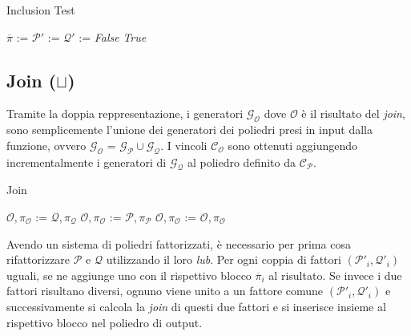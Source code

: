 \documentclass{mimosis}
\theoremstyle{definition}
\begin{document}
\begin{algorithm}[H]
\caption{Inclusion Test}\label{inclusion test}
\begin{algorithmic}[1]
\State$\overline{\pi}$ := 
\State$\mathcal{P}'$ := 
\State$\mathcal{Q}'$ := 
 
\State\Return\textit{False}
\EndIf
\EndFor
\State\Return\textit{True}
\EndFunction
\end{algorithmic}
\end{algorithm}

\subsection{Join (\(\sqcup\))}
\label{sec:org2a1aa1d}
Tramite la doppia reppresentazione, i generatori \(\mathcal{G}_{\mathcal{O}}\)
dove \(\mathcal{O}\) è il risultato del \emph{join}, sono semplicemente l'unione dei
generatori dei poliedri presi in input dalla funzione, ovvero
\(\mathcal{G}_{\mathcal{O}}\) = \(\mathcal{G}_{\mathcal{P}} \cup
\mathcal{G}_{\mathcal{Q}}\). I vincoli \(\mathcal{C}_{\mathcal{O}}\) sono ottenuti
aggiungendo incrementalmente i generatori di \(\mathcal{G}_{\mathcal{Q}}\) al
poliedro definito da \(\mathcal{C}_{\mathcal{P}}\).

\begin{algorithm}[H]
\caption{Join}\label{join}
\begin{algorithmic}[1]
\State$\mathcal{O}, \pi_{\mathcal{O}}$ := $\mathcal{Q}, \pi_{\mathcal{Q}}$
\State$\mathcal{O}, \pi_{\mathcal{O}}$ := $\mathcal{P}, \pi_{\mathcal{P}}$
\Else
\State$\mathcal{O}, \pi_{\mathcal{O}}$ := 
\EndIf
\State\Return$\mathcal{O}, \pi_{\mathcal{O}}$
\EndFunction
\end{algorithmic}
\end{algorithm}

Avendo un sistema di poliedri fattorizzati, è necessario per prima cosa
rifattorizzare \(\mathcal{P}\) e \(\mathcal{Q}\) utilizzando il loro \emph{lub}. Per ogni
coppia di fattori \((\mathcal{P}'_{i}, \mathcal{Q}'_{i})\) uguali, se ne aggiunge
uno con il rispettivo blocco \(\overline{\pi}_i\) al risultato. Se invece i due
fattori risultano diversi, ognuno viene unito a un fattore comune
\((\mathcal{P}'_{i}, \mathcal{Q}'_{i})\) e successivamente si calcola la \emph{join} di
questi due fattori e si inserisce insieme al rispettivo blocco nel poliedro di
output.
\end{document}
